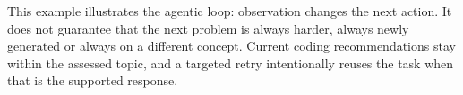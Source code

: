 This example illustrates the agentic loop: observation changes the next action. It does not guarantee that the next problem is always harder, always newly generated or always on a different concept. Current coding recommendations stay within the assessed topic, and a targeted retry intentionally reuses the task when that is the supported response.
